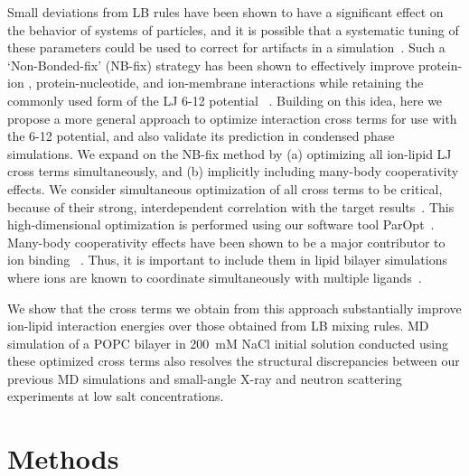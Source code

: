 Small deviations from LB rules have been shown to have a significant
    effect on the behavior of systems of particles\cite{boda:2008:effects}, and
    it is possible that a systematic tuning of these parameters could be used to correct 
    for artifacts in a simulation~\cite{baker:2010:accurate,yoo:2012:improved,fyta:2012:ionic,mamatkulov:2013:force,venable:2013,
savelyev:2014:balancing,li:2015:representation,savelyev:2015:competition,jing:2017:study,reif:2017,wineman:2019}.
Such a `Non-Bonded-fix' (NB-fix) strategy has been shown to effectively improve 
protein-ion 
, protein-nucleotide, and ion-membrane interactions 
while retaining the commonly used form of the LJ 6-12 potential~
\cite{baker:2010:accurate,yoo:2012:improved,fyta:2012:ionic,mamatkulov:2013:force,venable:2013,
savelyev:2014:balancing,li:2015:representation,savelyev:2015:competition,jing:2017:study,reif:2017,wineman:2019}. 
Building on this idea, here we propose a more 
general approach to optimize interaction cross terms
for use with the 6-12 potential, 
and also validate its prediction in condensed phase simulations.  
We expand on the NB-fix method by
(a) optimizing all ion-lipid LJ cross terms simultaneously, and 
(b) implicitly including many-body cooperativity effects.
We consider simultaneous optimization of all cross terms to be critical, 
because of their strong, interdependent correlation with the target results~\cite{fogarty:2014:paropt}.
This high-dimensional optimization is performed using our software tool
ParOpt~\cite{fogarty:2014:paropt,fogarty:2014:thesis}.
Many-body cooperativity effects have been shown to be a major contributor to ion 
binding~\cite{varma:2010}
. Thus, it is important to include them in lipid bilayer simulations where ions are known
to coordinate simultaneously with multiple ligands~\cite{kruczek:2019}.

We show that the cross terms we obtain from this approach substantially improve 
ion-lipid interaction energies over those obtained from LB mixing rules. 
MD simulation of a POPC bilayer
 in 200~mM NaCl initial solution 
conducted using these optimized cross terms also 
resolves the structural discrepancies between our 
previous MD simulations and small-angle X-ray and neutron scattering experiments 
at low salt concentrations.


\section{Methods}

